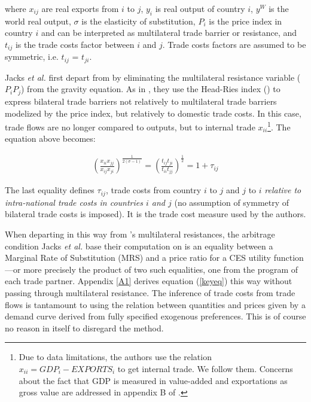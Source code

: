 \documentclass{article}
\begin{document}
where $x_{ij}$ are real exports from $i$ to $j$, $y_i$ is real
output of country $i$, $y^W$ is the world real output, $\sigma$
is the elasticity of substitution, $P_i$ is the price index in
country $i$ and can be interpreted as multilateral trade
barrier or resistance, and $t_{ij}$ is the trade costs factor between $i$
and $j$. Trade costs factors are assumed to be symmetric, i.e.
$t_{ij}$ = $t_{ji}$.

Jacks \textit{et al.} first depart from \cite{AW2003} by eliminating the
multilateral resistance variable ($P_i P_j$) from the gravity equation.
As in \cite{NOVY}, they use the Head-Ries index (\cite{HR2001}) to express bilateral trade barriers not relatively to multilateral trade barriers modelized by
the price index, but relatively to domestic trade costs. In this case,
trade flows are no longer compared to outputs, but to internal
trade $x_{ii}$\footnote{Due to data limitations, the authors
use the relation $x_{ii}=GDP_i-EXPORTS_i$ to get internal
trade. We follow them. Concerns about the fact that GDP is
measured in value-added and exportations as gross value are
addressed in appendix B of \cite{JMN2011}.}. The equation above
becomes:

\begin{eqnarray}
\left( \frac{x_{ii} x_{jj}}{x_{ij} x_{ji}}\right)^{\frac{1}{2(\sigma-1)}} =\left(\frac{t_{ij} t_{ji}}{t_{ii} t_{jj}} \right)^{\frac{1}{2}} = 1+\tau_{ij} \label{keyeq}
\end{eqnarray}

The last equality defines $\tau_{ij}$, trade costs from country $i$ to $j$ and $j$ to $i$ \emph{relative to intra-national trade costs in countries $i$ and $j$} (no assumption of symmetry of bilateral trade costs is imposed). It is the trade cost measure used by the authors.

When departing in this way from \cite{AW2003}'s multilateral resistances, the arbitrage condition Jacks \textit{et al.} base their computation on is an equality between a Marginal Rate of Substitution (MRS) and a price ratio for a CES utility function---or more precisely the product of two such equalities, one from the program of each trade partner. 
Appendix \ref{A1} derives equation (\ref{keyeq}) this way without passing through multilateral resistance.
The inference of trade costs from trade flows is tantamount to using the relation between quantities and prices given by a demand curve derived from fully specified exogenous preferences. This is of course no reason in itself to disregard the method.
\end{document}
